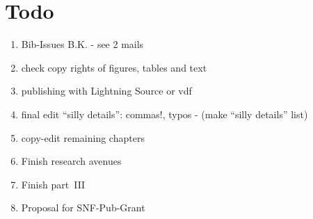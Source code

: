 \section*{Todo}

\begin{enumerate}\styleEnumerate

\item Bib-Issues B.K. - see 2 mails

\item check copy rights of figures, tables and text

\item publishing with Lightning Source or vdf

\item final edit ``silly details'': commas!, typos - (make ``silly details'' list)

\item copy-edit remaining chapters

\item Finish research avenues

\item Finish part~III

\item Proposal for SNF-Pub-Grant








\end{enumerate}
